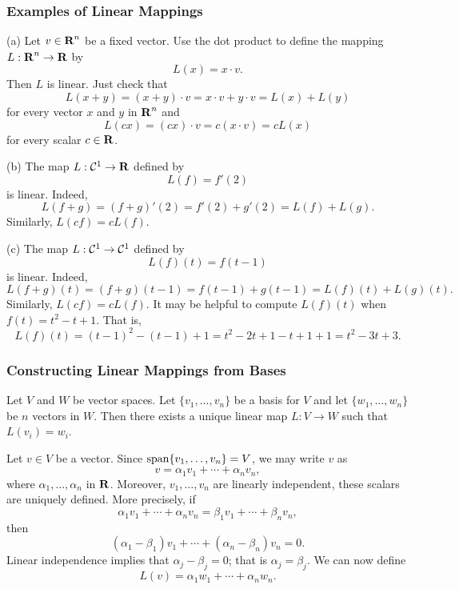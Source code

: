 \subsubsection*{Examples of Linear Mappings}

\noindent (a) Let $v\in\mbox{$\bf{R}$}^n$ be a fixed vector.  Use the
dot product to define the mapping
$L:\mbox{$\bf{R}$}^n\to\mbox{$\bf{R}$}$ by
\[
L(x)= x\cdot v.
\]
Then $L$ is linear.  Just check that
\[
L(x+y) = (x+y)\cdot v = x\cdot v + y\cdot v = L(x) + L(y)
\]
for every vector $x$ and $y$ in $\mbox{$\bf{R}$}^n$ and
\[
L(cx) = (cx)\cdot v = c(x\cdot v) = cL(x)
\]
for every scalar $c\in\mbox{$\bf{R}$}$.

\noindent (b) The map $L:{\cal C}^1\to\mbox{$\bf{R}$}$ defined by
\[
L(f) = f'(2)
\]
is linear.  Indeed,
\[
L(f+g) = (f+g)'(2) = f'(2) + g'(2) = L(f) + L(g).
\]
Similarly, $L(cf)=cL(f)$.

\noindent (c) The map $L:{\cal C}^1\to{\cal C}^1$ defined by
\[
L(f)(t)=f(t-1)
\]
is linear.  Indeed,
\[
L(f+g)(t) = (f+g)(t-1) = f(t-1) + g(t-1) = L(f)(t) + L(g)(t).
\]
Similarly, $L(cf)=cL(f)$.  It may be helpful to compute $L(f)(t)$ when
$f(t)=t^2-t+1$.  That is,
\[
L(f)(t) = (t-1)^2-(t-1)+1 = t^2-2t+1-t+1+1 = t^2-3t+3.
\]


\subsubsection*{Constructing Linear Mappings from Bases}

\begin{thm} \label{L:linmapfrombasis}
Let $V$ and $W$ be vector spaces.  Let $\{v_1,\ldots,v_n\}$ be a
basis for $V$ and let $\{w_1,\ldots,w_n\}$ be $n$ vectors in $W$.
Then there exists a unique linear map $L:V\to W$ such that $L(v_i)=w_i$.
\end{thm}

\proof Let $v\in V$ be a vector.  Since ${\rm span}\{v_1,\ldots,v_n\}=V$, we may
write $v$ as
\[
v = \alpha_1v_1 + \cdots + \alpha_nv_n,
\]
where $\alpha_1,\ldots,\alpha_n$ in $\mbox{$\bf{R}$}$.   Moreover, $v_1,\ldots,v_n$
are linearly independent, these scalars are uniquely defined.  More
precisely, if
\[
\alpha_1v_1 + \cdots + \alpha_nv_n = \beta_1v_1 + \cdots + \beta_nv_n,
\]
then
\[
(\alpha_1-\beta_1)v_1 + \cdots + (\alpha_n-\beta_n)v_n = 0.
\]
Linear independence implies that $\alpha_j-\beta_j=0$; that is
$\alpha_j=\beta_j$.   We can now define
\begin{equation}  \label{e:v-coord}
L(v) = \alpha_1 w_1+\cdots+\alpha_n w_n.
\end{equation}


